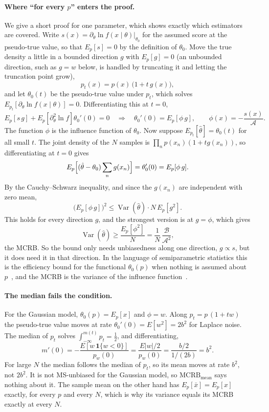 \documentclass[11pt]{article}
\numberwithin{figure}{section}
\numberwithin{equation}{section}
\begin{document}
\paragraph{Where ``for every $p$'' enters the proof.} We give a short proof for one parameter, which shows
exactly which estimators are covered. Write $s(x) = \partial_\theta \ln f(x\mid\theta)|_{\theta_0}$ for the
assumed score at the pseudo-true value, so that $E_p[s] = 0$ by the definition of $\theta_0$. Move the
true density a little in a bounded direction $g$ with $E_p[g] = 0$ (an unbounded direction, such as
$g = w$ below, is handled by truncating it and letting the truncation point grow),
\[
  p_t(x) = p(x)\,\bigl(1 + t\,g(x)\bigr),
\]
and let $\theta_0(t)$ be the pseudo-true value under $p_t$, which solves $E_{p_t}[\partial_\theta\ln
f(x\mid\theta)] = 0$. Differentiating this at $t = 0$,
\[
  E_p[s\,g] + E_p\!\left[\partial^2_\theta \ln f\right]\theta_0'(0) = 0
  \quad\Longrightarrow\quad
  \theta_0'(0) = E_p[\phi\, g], \qquad \phi(x) = -\frac{s(x)}{\mathcal{A}}.
\]
The function $\phi$ is the influence function of $\theta_0$. Now suppose $E_{p_t}[\hat\theta] =
\theta_0(t)$ for all small $t$. The joint density of the $N$ samples is $\prod_n p(x_n)(1 + t g(x_n))$, so
differentiating at $t = 0$ gives
\[
  E_p\Bigl[(\hat\theta - \theta_0)\sum_{n} g(x_n)\Bigr] = \theta_0'(0) = E_p[\phi\,g].
\]
By the Cauchy--Schwarz inequality, and since the $g(x_n)$ are independent with zero mean,
\[
  \bigl(E_p[\phi\,g]\bigr)^2 \leq \operatorname{Var}(\hat\theta)\cdot N\,E_p[g^2].
\]
This holds for every direction $g$, and the strongest version is at $g = \phi$, which gives
\[
  \operatorname{Var}(\hat\theta) \geq \frac{E_p[\phi^2]}{N} = \frac{1}{N}\,\frac{\mathcal{B}}{\mathcal{A}^2},
\]
the MCRB. So the bound only needs unbiasedness along one direction, $g \propto s$, but it does need
it in that direction. In the language of semiparametric statistics this is the efficiency bound for the
functional $\theta_0(p)$ when nothing is assumed about $p$~\cite[Ch.~25]{vdv}, and the MCRB is the
variance of the influence function~\cite{buja}.

\paragraph{The median fails the condition.} For the Gaussian model, $\theta_0(p) = E_p[x]$ and $\phi = w$.
Along $p_t = p\,(1 + t w)$ the pseudo-true value moves at rate $\theta_0'(0) = E[w^2] = 2b^2$ for Laplace
noise. The median of $p_t$ solves $\int_{-\infty}^{m(t)} p_t = \tfrac12$, and differentiating,
\[
  m'(0) = -\frac{E[w\,\mathbf{1}\{w < 0\}]}{p_w(0)} = \frac{E|w|/2}{p_w(0)} = \frac{b/2}{1/(2b)} = b^2 .
\]
For large $N$ the median follows the median of $p_t$, so its mean moves at rate $b^2$, not $2b^2$. It is
not MS-unbiased for the Gaussian model, so $\text{MCRB}_{\text{mean}}$ says nothing about it. The sample
mean on the other hand has $E_p[\bar x] = E_p[x]$ exactly, for every $p$ and every $N$, which is why its
variance equals its MCRB exactly at every $N$.
\end{document}

